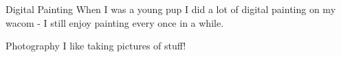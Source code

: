 \begin{section}
  \entry%
    {}
    {}
    {\hspace{.5em} Digital Painting}
    {}
    {%
      When I was a young pup I did a lot of digital painting on my wacom - I still enjoy painting every once in a while.
    }

  \entry%
    {} 
    {} 
    {\hspace{.5em} Photography}
    {} 
    {%
      I like taking pictures of stuff!
    }
\end{section}
